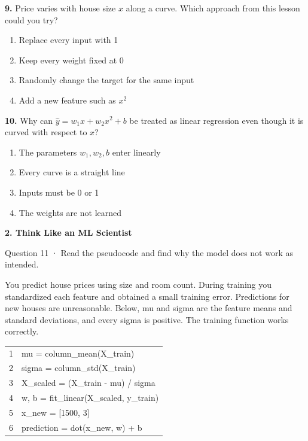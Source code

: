 \documentclass[11pt,a4paper]{article}
\newcommand{\parttitle}[2]{{\large\bfseries\color{ink} #1}\par{\small #2}\par\vspace{5mm}}
\newcommand{\question}[2]{\textbf{#1.} #2\par}
\begin{document}
\question{9}{Price varies with house size $x$ along a curve. Which approach from this lesson could you try?}
\begin{enumerate}[label=(\arabic*),leftmargin=9mm,itemsep=0pt,topsep=2pt,parsep=0pt]
\item Replace every input with 1
\item Keep every weight fixed at 0
\item Randomly change the target for the same input
\item Add a new feature such as $x^2$
\end{enumerate}\vfill
\question{10}{Why can $\hat y=w_1x+w_2x^2+b$ be treated as linear regression even though it is curved with respect to $x$?}
\begin{enumerate}[label=(\arabic*),leftmargin=9mm,itemsep=0pt,topsep=2pt,parsep=0pt]
\item The parameters $w_1,w_2,b$ enter linearly
\item Every curve is a straight line
\item Inputs must be 0 or 1
\item The weights are not learned
\end{enumerate}\vfill
\newpage
\parttitle{2. Think Like an ML Scientist}{Question 11 · Read the pseudocode and find why the model does not work as intended.}
You predict house prices using size and room count. During training you standardized each feature and obtained a small training error. Predictions for new houses are unreasonable. Below, mu and sigma are the feature means and standard deviations, and every sigma is positive. The training function works correctly.
\par\vspace{3mm}
{\small\ttfamily\begin{tabular}{r l}
1 & \hspace*{0.0mm}mu = column\_mean(X\_train) \\
2 & \hspace*{0.0mm}sigma = column\_std(X\_train) \\
3 & \hspace*{0.0mm}X\_scaled = (X\_train - mu) / sigma \\
4 & \hspace*{0.0mm}w, b = fit\_linear(X\_scaled, y\_train) \\
5 & \hspace*{0.0mm}x\_new = [1500, 3] \\
6 & \hspace*{0.0mm}prediction = dot(x\_new, w) + b \\
\end{tabular}}\par\vspace{5mm}
\end{document}
